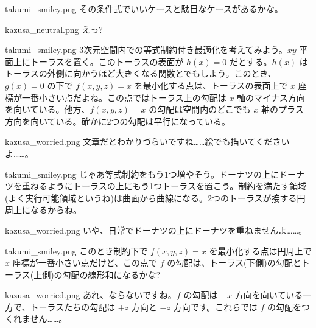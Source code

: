 \documentclass[b5paper,xelatex,ja=standard,10pt]{bxjsarticle}
\begin{document}
\begin{SERIFU}[colback=PaleGold, colbacktitle=PaleGold2]{takumi_smiley.png}
その条件式でいいケースと駄目なケースがあるかな。
\end{SERIFU}

\begin{SERIFU}[colback=PaleIris, colbacktitle=PaleIris2]{kazusa_neutral.png}
えっ?
\end{SERIFU}

\begin{SERIFU}[colback=PaleGold, colbacktitle=PaleGold2]{takumi_smiley.png}
3次元空間内での等式制約付き最適化を考えてみよう。$xy$ 平面上にトーラスを置く。このトーラスの表面が $h(x)=0$ だとする。$h(x)$ はトーラスの外側に向かうほど大きくなる関数とでもしよう。このとき、$g(x)=0$ の下で $f(x, y, z) = x$ を最小化する点は、トーラスの表面上で $x$ 座標が一番小さい点だよね。この点ではトーラス上の勾配は $x$ 軸のマイナス方向を向いている。他方、$f(x, y, z) = x$ の勾配は空間内のどこでも $x$ 軸のプラス方向を向いている。確かに2つの勾配は平行になっている。
\end{SERIFU}

\begin{SERIFU}[colback=PaleIris, colbacktitle=PaleIris2]{kazusa_worried.png}
文章だとわかりづらいですね……絵でも描いてくださいよ……。
\end{SERIFU}

\begin{SERIFU}[colback=PaleGold, colbacktitle=PaleGold2]{takumi_smiley.png}
じゃあ等式制約をもう1つ増やそう。ドーナツの上にドーナツを重ねるようにトーラスの上にもう1つトーラスを置こう。制約を満たす領域(よく実行可能領域というね)は曲面から曲線になる。2つのトーラスが接する円周上になるからね。
\end{SERIFU}

\begin{SERIFU}[colback=PaleIris, colbacktitle=PaleIris2]{kazusa_worried.png}
いや、日常でドーナツの上にドーナツを重ねませんよ……。
\end{SERIFU}

\begin{SERIFU}[colback=PaleGold, colbacktitle=PaleGold2]{takumi_smiley.png}
このとき制約下で $f(x, y, z)=x$ を最小化する点は円周上で $x$ 座標が一番小さい点だけど、この点で $f$ の勾配は、トーラス(下側)の勾配とトーラス(上側)の勾配の線形和になるかな?
\end{SERIFU}

\begin{SERIFU}[colback=PaleIris, colbacktitle=PaleIris2]{kazusa_worried.png}
あれ、ならないですね。$f$ の勾配は $-x$ 方向を向いている一方で、トーラスたちの勾配は $+z$ 方向と $-z$ 方向です。これらでは $f$ の勾配をつくれません……。
\end{SERIFU}
\end{document}
